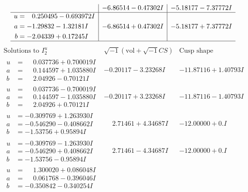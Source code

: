 \documentclass[1p]{elsarticle_modified}
\theoremstyle{definition}
\newcommand{\I}{\sqrt{-1}}
\begin{document}
$$\begin{array}{c|c|c}
 & -6.86514 - 0.47302 I & -5.18177 - 7.37772 I \\ \hline\begin{aligned}
u &= \phantom{-}0.250495 - 0.693972 I \\
a &= -1.29832 - 1.32181 I \\
b &= -2.04339 + 0.17245 I\end{aligned}
 & -6.86514 + 0.47302 I & -5.18177 + 7.37772 I\\
 \hline 
 \end{array}$$\newpage$$\begin{array}{c|c|c}  
\text{Solutions to }I^u_{2}& \I (\text{vol} + \sqrt{-1}CS) & \text{Cusp shape}\\
 \hline 
\begin{aligned}
u &= \phantom{-}0.037736 + 0.700019 I \\
a &= \phantom{-}0.144597 + 1.035880 I \\
b &= \phantom{-}2.04926 - 0.70121 I\end{aligned}
 & -0.20117 - 3.23268 I & -11.87116 + 1.40793 I \\ \hline\begin{aligned}
u &= \phantom{-}0.037736 - 0.700019 I \\
a &= \phantom{-}0.144597 - 1.035880 I \\
b &= \phantom{-}2.04926 + 0.70121 I\end{aligned}
 & -0.20117 + 3.23268 I & -11.87116 - 1.40793 I \\ \hline\begin{aligned}
u &= -0.309769 + 1.263930 I \\
a &= -0.546290 - 0.408662 I \\
b &= -1.53756 + 0.95894 I\end{aligned}
 & \phantom{-}2.71461 + 4.34687 I & -12.00000 + 0. I\phantom{ +0.000000I} \\ \hline\begin{aligned}
u &= -0.309769 - 1.263930 I \\
a &= -0.546290 + 0.408662 I \\
b &= -1.53756 - 0.95894 I\end{aligned}
 & \phantom{-}2.71461 - 4.34687 I & -12.00000 + 0. I\phantom{ +0.000000I} \\ \hline\begin{aligned}
u &= \phantom{-}1.300020 + 0.086048 I \\
a &= \phantom{-}0.061768 - 0.396046 I \\
b &= -0.350842 - 0.340254 I\end{aligned}

\end{array}$$
\end{document}
